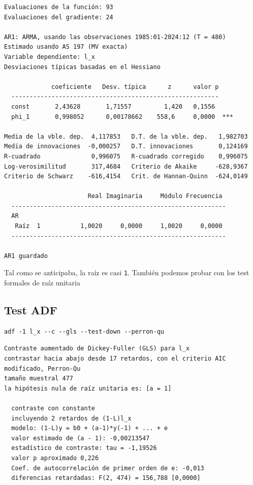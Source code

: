 \documentclass[10pt]{article}
\begin{document}
\begin{verbatim}
Evaluaciones de la función: 93
Evaluaciones del gradiente: 24

AR1: ARMA, usando las observaciones 1985:01-2024:12 (T = 480)
Estimado usando AS 197 (MV exacta)
Variable dependiente: l_x
Desviaciones típicas basadas en el Hessiano

             coeficiente   Desv. típica      z      valor p
  ---------------------------------------------------------
  const       2,43628       1,71557         1,420   0,1556 
  phi_1       0,998052      0,00178662    558,6     0,0000  ***

Media de la vble. dep.  4,117853   D.T. de la vble. dep.   1,982703
Media de innovaciones  -0,000257   D.T. innovaciones       0,124169
R-cuadrado              0,996075   R-cuadrado corregido    0,996075
Log-verosimilitud       317,4684   Criterio de Akaike     -628,9367
Criterio de Schwarz    -616,4154   Crit. de Hannan-Quinn  -624,0149

                       Real Imaginaria     Módulo Frecuencia
  -----------------------------------------------------------
  AR
   Raíz  1           1,0020     0,0000     1,0020     0,0000
  -----------------------------------------------------------

AR1 guardado
\end{verbatim}


Tal como se anticipaba, la raíz es casi \texttt{1}. También podemos probar
con los test formales de raíz unitaria
\subsection*{Test ADF}
\label{sec:orgd29d59f}

\begin{verbatim}
adf -1 l_x --c --gls --test-down --perron-qu 
\end{verbatim}

\begin{verbatim}
Contraste aumentado de Dickey-Fuller (GLS) para l_x
contrastar hacia abajo desde 17 retardos, con el criterio AIC modificado, Perron-Qu
tamaño muestral 477
la hipótesis nula de raíz unitaria es: [a = 1]

  contraste con constante 
  incluyendo 2 retardos de (1-L)l_x
  modelo: (1-L)y = b0 + (a-1)*y(-1) + ... + e
  valor estimado de (a - 1): -0,00213547
  estadístico de contraste: tau = -1,19526
  valor p aproximado 0,226
  Coef. de autocorrelación de primer orden de e: -0,013
  diferencias retardadas: F(2, 474) = 156,788 [0,0000]
\end{verbatim}
\end{document}
